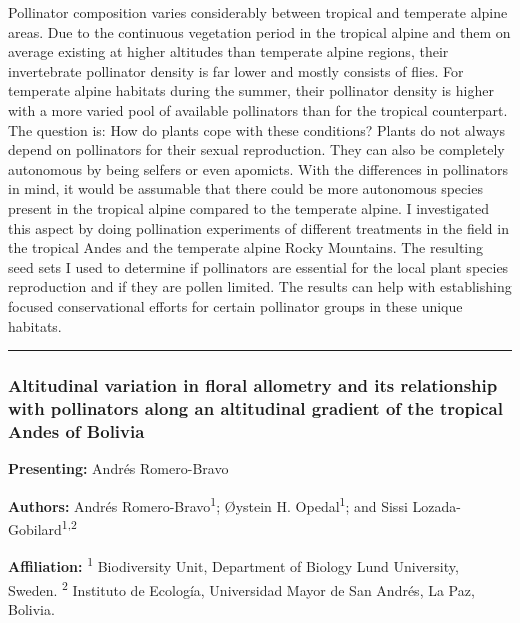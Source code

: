 \documentclass[
  letterpaper,
  DIV=11,
  numbers=noendperiod]{scrartcl}
\begin{document}
Pollinator composition varies considerably between tropical and
temperate alpine areas. Due to the continuous vegetation period in the
tropical alpine and them on average existing at higher altitudes than
temperate alpine regions, their invertebrate pollinator density is far
lower and mostly consists of flies. For temperate alpine habitats during
the summer, their pollinator density is higher with a more varied pool
of available pollinators than for the tropical counterpart. The question
is: How do plants cope with these conditions? Plants do not always
depend on pollinators for their sexual reproduction. They can also be
completely autonomous by being selfers or even apomicts. With the
differences in pollinators in mind, it would be assumable that there
could be more autonomous species present in the tropical alpine compared
to the temperate alpine. I investigated this aspect by doing pollination
experiments of different treatments in the field in the tropical Andes
and the temperate alpine Rocky Mountains. The resulting seed sets I used
to determine if pollinators are essential for the local plant species
reproduction and if they are pollen limited. The results can help with
establishing focused conservational efforts for certain pollinator
groups in these unique habitats.

\begin{center}\rule{0.5\linewidth}{0.5pt}\end{center}

\subsubsection{Altitudinal variation in floral allometry and its
relationship with pollinators along an altitudinal gradient of the
tropical Andes of
Bolivia}\label{altitudinal-variation-in-floral-allometry-and-its-relationship-with-pollinators-along-an-altitudinal-gradient-of-the-tropical-andes-of-bolivia}

\textbf{Presenting:} Andrés Romero-Bravo

\textbf{Authors:} Andrés Romero-Bravo\textsuperscript{1}; Øystein H.
Opedal\textsuperscript{1}; and Sissi
Lozada-Gobilard\textsuperscript{1,2}

\textbf{Affiliation:} \textsuperscript{1} Biodiversity Unit, Department
of Biology Lund University, Sweden. \textsuperscript{2} Instituto de
Ecología, Universidad Mayor de San Andrés, La Paz, Bolivia.
\end{document}
